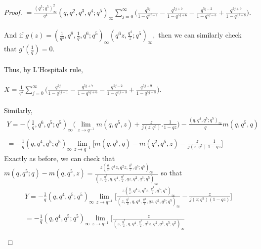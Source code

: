 \documentclass[10pt,reqno]{amsart}
\begin{document}
\begin{proof}
 $=\displaystyle\frac{(q^5;q^5)_{\infty}^2}{q^4}(q,q^2,q^3,q^4;q^5)_{\infty}\displaystyle\sum_{j=0}^{\infty}\Bigg(\displaystyle\frac{q^{5j}}{1-q^{5j-1}}-\displaystyle\frac{q^{5j+7}}{1-q^{5j+6}}-\displaystyle\frac{q^{5j-2}}{1-q^{5j-3}}+\displaystyle\frac{q^{5j+9}}{1-q^{5j+8}}\Bigg).$ \\ \\
 And if $g(z)=(\displaystyle\frac{1}{q^3},q^8,\displaystyle\frac{1}{q},q^6;q^5)_{\infty}(q^6z,\displaystyle\frac{q^4}{z};q^5)_{\infty},$ then we can similarly check that $g'(\displaystyle\frac{1}{q})=0.$ \\ \\
 Thus, by L'Hospitals rule, \\ \\ $X=\displaystyle\frac{1}{q^2}\displaystyle\sum_{j=0}^{\infty}\Bigg(\displaystyle\frac{q^{5j}}{1-q^{5j-1}}-\displaystyle\frac{q^{5j+7}}{1-q^{5j+6}}-\displaystyle\frac{q^{5j-2}}{1-q^{5j-3}}+\displaystyle\frac{q^{5j+9}}{1-q^{5j+8}}\Bigg).$ \\ \\
 Similarly, 
 \begin{multline*}
     Y=-(\displaystyle\frac{1}{q},q^6,q^5;q^5)_{\infty}\Bigg(\lim_{z\to q^{-1}}m(q,q^5,z)+\displaystyle\frac{z}{j(z;q^5)}.\displaystyle\frac{1}{1-qz}\Bigg)-\displaystyle\frac{(q,q^4,q^5;q^5)_{\infty}}{q}m(q,q^5,q) \\ \\
     =-\displaystyle\frac{1}{q}(q,q^4,q^5;q^5)_{\infty}\lim_{z\to q^{-1}}\Bigg[m(q,q^5,q)-m(q^2,q^5,z)-\displaystyle\frac{z}{j(z;q^5)}\displaystyle\frac{1}{1-qz}\Bigg]
 \end{multline*}
 Exactly as before, we can check that $m(q,q^5;q)-m(q,q^5,z)=\displaystyle\frac{z(\displaystyle\frac{q}{z},q^4z,q^2z,\displaystyle\frac{q^3}{z},q^5;q^5)_{\infty}}{(z,\displaystyle\frac{q^5}{z},q,q^4,\displaystyle\frac{q^4}{z},qz,q^2,q^3;q^5)_{\infty}}$ so that 
 \begin{multline*}
 Y=-\displaystyle\frac{1}{q}(q,q^4,q^5;q^5)_{\infty}\lim_{z\to q^{-1}}\Bigg[\displaystyle\frac{z(\displaystyle\frac{q}{z},q^4z,q^2z,\displaystyle\frac{q^3}{z},q^5;q^5)_{\infty}}{(z,\displaystyle\frac{q^5}{z},q,q^4,\displaystyle\frac{q^4}{z},qz,q^2,q^3;q^5)_{\infty}}-\displaystyle\frac{z}{j(z;q^5)(1-qz)}\Bigg]\\ \\
 =-\displaystyle\frac{1}{q}(q,q^4,q^5;q^5)_{\infty}\lim_{z\to q^{-1}}\Bigg[\displaystyle\frac{z}{(z,\displaystyle\frac{q^5}{z},q,q^4,\displaystyle\frac{q^4}{z},q^6z,q^2,q^3,q^5;q^5)_{\infty}} \\ \\

\end{multline*}
\end{proof}
\end{document}
